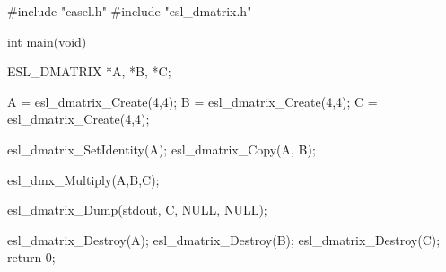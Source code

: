 \begin{cchunk}
#include "easel.h"
#include "esl_dmatrix.h"

int main(void)
{
  ESL_DMATRIX *A, *B, *C;

  A = esl_dmatrix_Create(4,4);
  B = esl_dmatrix_Create(4,4);
  C = esl_dmatrix_Create(4,4);
  
  esl_dmatrix_SetIdentity(A);
  esl_dmatrix_Copy(A, B);

  esl_dmx_Multiply(A,B,C);

  esl_dmatrix_Dump(stdout, C, NULL, NULL);

  esl_dmatrix_Destroy(A);
  esl_dmatrix_Destroy(B);
  esl_dmatrix_Destroy(C);
  return 0;
}
\end{cchunk}
